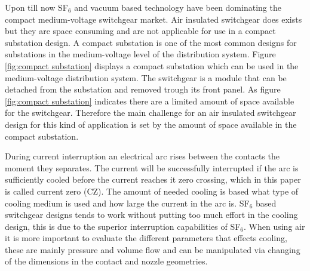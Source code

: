\documentclass[10pt,a4paper,twoside]{article}
\begin{document}
Upon till now SF$_6$ and vacuum based technology have been dominating the compact medium-voltage switchgear market. Air insulated switchgear does exists but they are space consuming and are not applicable for use in a compact substation design. A compact substation is one of the most common designs for substations in the medium-voltage level of the distribution system. Figure \ref{fig:compact substation} displays a compact substation which can be used in the medium-voltage distribution system. The switchgear is a module that can be detached from the substation and removed trough its front panel. As figure \ref{fig:compact substation} indicates there are a limited amount of space available for the switchgear. Therefore the main challenge for an air insulated switchgear design for this kind of application is set by the amount of space available in the compact substation.

During current interruption an electrical arc rises between the contacts the moment they separates. The current will be successfully interrupted if the arc is sufficiently cooled before the current reaches it zero crossing, which in this paper is called current zero (CZ). The amount of needed cooling is based what type of cooling medium is used and how large the current in the arc is. SF$_6$ based switchgear designs tends to work without putting too much effort in the cooling design, this is due to the superior interruption capabilities of SF$_6$. When using air it is more important to evaluate the different parameters that effects cooling, these are mainly pressure and volume flow and can be manipulated via changing of the dimensions in the contact and nozzle geometries.
\end{document}
